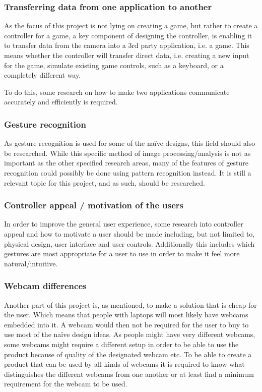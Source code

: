 \subsubsection{Transferring data from one application to another}
As the focus of this project is not lying on creating a game, but rather to create a controller for a game, a key component of designing the controller, is enabling it to transfer data from the camera into a 3rd party application, i.e. a game. This means whether the controller will transfer direct data, i.e. creating a new input for the game, simulate existing game controls, such as a keyboard, or a completely different way.

To do this, some research on how to make two applications communicate accurately and efficiently is required.

\subsubsection{Gesture recognition}
As gesture recognition is used for some of the naïve designs, this field should also be researched. While this specific method of image processing/analysis is not as important as the other specified research areas, many of the features of gesture recognition could possibly be done using pattern recognition instead. It is still a relevant topic for this project, and as such, should be researched.

\subsubsection{Controller appeal / motivation of the users}
In order to improve the general user experience, some research into controller appeal and how to motivate a user should be made including, but not limited to, physical design, user interface and user controls. Additionally this includes which gestures are most appropriate for a user to use in order to make it feel more natural/intuitive.

\subsubsection{Webcam differences}
Another part of this project is, as mentioned, to make a solution that is cheap for the user. Which means that people with laptops will most likely have webcams embedded into it. A webcam would then not be required for the user to buy to use most of the naïve design ideas. As people might have very different webcams, some webcams might require a different setup in order to be able to use the product because of quality of the designated webcam etc. To be able to create a product that can be used by all kinds of webcams it is required to know what distinguishes the different webcams from one another or at least find a minimum requirement for the webcam to be used.